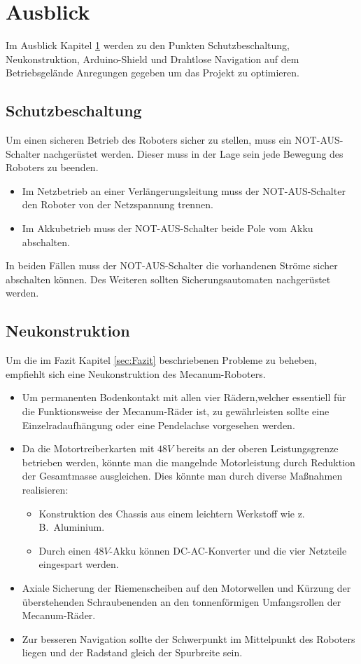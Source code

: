 
\section{Ausblick}
\label{sec:Ausblick}
Im Ausblick Kapitel \ref{sec:Ausblick} werden zu den Punkten Schutzbeschaltung, Neukonstruktion, Arduino-Shield und Drahtlose Navigation auf dem Betriebsgelände Anregungen gegeben um das Projekt zu optimieren.

\subsection{Schutzbeschaltung}
\label{sec:Schutzbeschaltung}
Um einen sicheren Betrieb des Roboters sicher zu stellen, muss ein NOT-AUS-Schalter nachgerüstet werden. Dieser muss in der Lage sein jede Bewegung des Roboters zu beenden.
\begin{itemize}
\item{Im Netzbetrieb an einer Verlängerungsleitung muss der NOT-AUS-Schalter den Roboter von der Netzspannung trennen.}
\item{Im Akkubetrieb muss der NOT-AUS-Schalter beide Pole vom Akku abschalten.}
\end{itemize}
In beiden Fällen muss der NOT-AUS-Schalter die vorhandenen Ströme sicher abschalten können. Des Weiteren sollten Sicherungsautomaten nachgerüstet werden.

\subsection{Neukonstruktion}
\label{sec:Neukonstruktion}
Um die im Fazit Kapitel \ref{sec:Fazit} beschriebenen Probleme zu beheben, empfiehlt sich eine Neukonstruktion des Mecanum-Roboters.
\begin{itemize}
\item{Um permanenten Bodenkontakt mit allen vier Rädern,welcher essentiell für die Funktionsweise der Mecanum-Räder ist, zu gewährleisten sollte eine Einzelradaufhängung oder eine Pendelachse vorgesehen werden.}
\item{Da die Motortreiberkarten mit $48V$ bereits an der oberen Leistungsgrenze betrieben werden, könnte man die mangelnde Motorleistung durch Reduktion der Gesamtmasse ausgleichen. Dies könnte man durch diverse Maßnahmen realisieren:
\begin {itemize}
\item{Konstruktion des Chassis aus einem leichtern Werkstoff wie z.\,B.\ Aluminium.}
\item{Durch einen $48V$-Akku können DC-AC-Konverter und die vier Netzteile eingespart werden.}
\end{itemize}
}
\item{Axiale Sicherung der Riemenscheiben auf den Motorwellen und Kürzung der überstehenden Schraubenenden an den tonnenförmigen Umfangsrollen der Mecanum-Räder.}
\item{Zur besseren Navigation sollte der Schwerpunkt im Mittelpunkt des Roboters liegen und der Radstand gleich der Spurbreite sein.}
\end{itemize}

